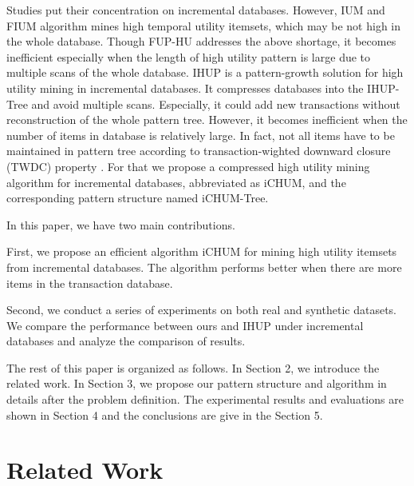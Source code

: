 \documentclass[runningheads,a4paper]{llncs}
\begin{document}
Studies \cite{Ahmed:IHUP,Lin:dynamic-databases,Lin:incremental-hui,Yeh:IUM} put their concentration on incremental databases. However, IUM and FIUM algorithm \cite{Yeh:IUM} mines high temporal utility itemsets, which may be not high in the whole database. Though FUP-HU \cite{Lin:dynamic-databases,Lin:incremental-hui} addresses the above shortage, it becomes inefficient especially when the length of high utility pattern is large due to multiple scans of the whole database. IHUP \cite{Ahmed:IHUP} is a pattern-growth solution for high utility mining in incremental databases. It compresses databases into the IHUP-Tree and avoid multiple scans. Especially, it could add new transactions without reconstruction of the whole pattern tree. However, it becomes inefficient when the number of items in database is relatively large. In fact, not all items have to be maintained in pattern tree according to transaction-wighted downward closure (TWDC) property \cite{Liu:two-phasewithCCPD}. For that we propose a compressed high utility mining algorithm for incremental databases, abbreviated as iCHUM, and the corresponding pattern structure named iCHUM-Tree.

In this paper, we have two main contributions.

First, we propose an efficient algorithm iCHUM for mining high utility itemsets from incremental databases. The algorithm performs better when there are more items in the transaction database.

Second, we conduct a series of experiments on both real and synthetic datasets. We compare the performance between ours and IHUP under incremental databases and analyze the comparison of results.

The rest of this paper is organized as follows. In Section 2, we introduce the related work. In Section 3, we propose our pattern structure and algorithm in details after the problem definition. The experimental results and evaluations are shown in Section 4 and the conclusions are give in the Section 5.

\section{Related Work}
\end{document}

